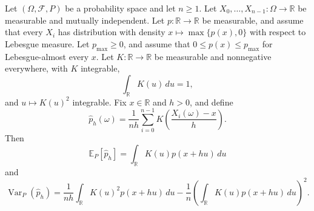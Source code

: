 \begin{theorem}
Let $(\Omega,\mathcal F,P)$ be a probability space and let $n\geq1$. Let
$X_0,\ldots,X_{n-1}:\Omega\to\mathbb R$ be measurable and mutually
independent. Let $p:\mathbb R\to\mathbb R$ be measurable, and assume that
every $X_i$ has distribution with density $x\mapsto\max\{p(x),0\}$ with
respect to Lebesgue measure. Let $p_{\max}\geq0$, and assume that
$0\leq p(x)\leq p_{\max}$ for Lebesgue-almost every $x$. Let
$K:\mathbb R\to\mathbb R$ be measurable and nonnegative everywhere, with
$K$ integrable,
\[
 \int_{\mathbb R}K(u)\,du=1,
\]
and $u\mapsto K(u)^2$ integrable. Fix $x\in\mathbb R$ and $h>0$, and define
\[
 \widehat p_h(\omega)=\frac1{nh}
 \sum_{i=0}^{n-1}K\!\left(\frac{X_i(\omega)-x}{h}\right).
\]
Then
\[
 \mathbb E_P[\widehat p_h]
 =\int_{\mathbb R}K(u)p(x+hu)\,du
\]
and
\[
 \operatorname{Var}_P(\widehat p_h)
 =\frac1{nh}\int_{\mathbb R}K(u)^2p(x+hu)\,du
 -\frac1n\left(\int_{\mathbb R}K(u)p(x+hu)\,du\right)^2.
\]
\end{theorem}
